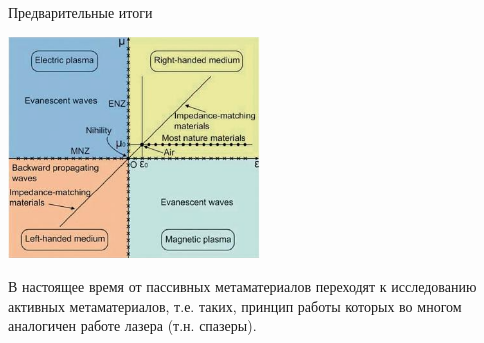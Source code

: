 \documentclass[9pt, compress, xcolor=table]{beamer}
\begin{document}
\begin{frame}{Предварительные итоги}

\begin{center}
\includegraphics[width=0.5\textwidth]{neg_ref_n11}
\end{center}
В настоящее время от пассивных метаматериалов переходят к исследованию активных метаматериалов, т.е. таких, принцип работы которых во многом аналогичен работе лазера (т.н. спазеры).
\end{frame}
\end{document}
